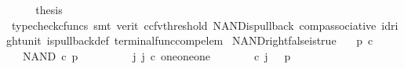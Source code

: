\begin{isabellebody}
\ \ \isamarkupfalse%
\ \isamarkupfalse%
\ {\isacharquery}{\kern0pt}thesis\ \isanewline
\ \ \ \ \isamarkupfalse%
\ {\isacharparenleft}{\kern0pt}typecheck{\isacharunderscore}{\kern0pt}cfuncs{\isacharcomma}{\kern0pt}\ smt\ {\isacharparenleft}{\kern0pt}verit{\isacharcomma}{\kern0pt}\ ccfv{\isacharunderscore}{\kern0pt}threshold{\isacharparenright}{\kern0pt}\ NAND{\isacharunderscore}{\kern0pt}is{\isacharunderscore}{\kern0pt}pullback\ comp{\isacharunderscore}{\kern0pt}associative{}\ id{\isacharunderscore}{\kern0pt}right{\isacharunderscore}{\kern0pt}unit{}\ is{\isacharunderscore}{\kern0pt}pullback{\isacharunderscore}{\kern0pt}def\ terminal{\isacharunderscore}{\kern0pt}func{\isacharunderscore}{\kern0pt}comp{\isacharunderscore}{\kern0pt}elem{\isacharparenright}{\kern0pt}\isanewline
{}\isamarkupfalse%
%
\endisatagproof
{\isafoldproof}%
%
\isadelimproof
\isanewline
%
\endisadelimproof
\isanewline
{}\isamarkupfalse%
\ NAND{\isacharunderscore}{\kern0pt}right{\isacharunderscore}{\kern0pt}false{\isacharunderscore}{\kern0pt}is{\isacharunderscore}{\kern0pt}true{\isacharcolon}{\kern0pt}\isanewline
\ \ \ {\isachardoublequoteopen}p\ {\isasymin}\isactrlsub c\ {\isasymOmega}{\isachardoublequoteclose}\isanewline
\ \ \ {\isachardoublequoteopen}NAND\ {\isasymcirc}\isactrlsub c\ {\isasymlangle}p{\isacharcomma}{\kern0pt}{\isasymf}{\isasymrangle}\ {\isacharequal}{\kern0pt}\ {\isasymt}{\isachardoublequoteclose}\isanewline
%
\isadelimproof
%
\endisadelimproof
%
\isatagproof
{}\isamarkupfalse%
\ {\isacharminus}{\kern0pt}\ \isanewline
\ \ \isamarkupfalse%
\ {\isachardoublequoteopen}{\isasymexists}\ j{\isachardot}{\kern0pt}\ j\ {\isasymin}\isactrlsub c\ one{\isasymCoprod}{\isacharparenleft}{\kern0pt}one{\isasymCoprod}one{\isacharparenright}{\kern0pt}\ {\isasymand}\ {\isacharparenleft}{\kern0pt}{\isasymlangle}{\isasymf}{\isacharcomma}{\kern0pt}\ {\isasymf}{\isasymrangle}{\isasymamalg}\ {\isacharparenleft}{\kern0pt}{\isasymlangle}{\isasymt}{\isacharcomma}{\kern0pt}\ {\isasymf}{\isasymrangle}\ {\isasymamalg}{\isasymlangle}{\isasymf}{\isacharcomma}{\kern0pt}\ {\isasymt}{\isasymrangle}{\isacharparenright}{\kern0pt}{\isacharparenright}{\kern0pt}\ {\isasymcirc}\isactrlsub c\ j\ \ {\isacharequal}{\kern0pt}\ {\isasymlangle}p{\isacharcomma}{\kern0pt}{\isasymf}{\isasymrangle}{\isachardoublequoteclose}\isanewline
\ \ \ \ \isamarkupfalse%

\end{isabellebody}
